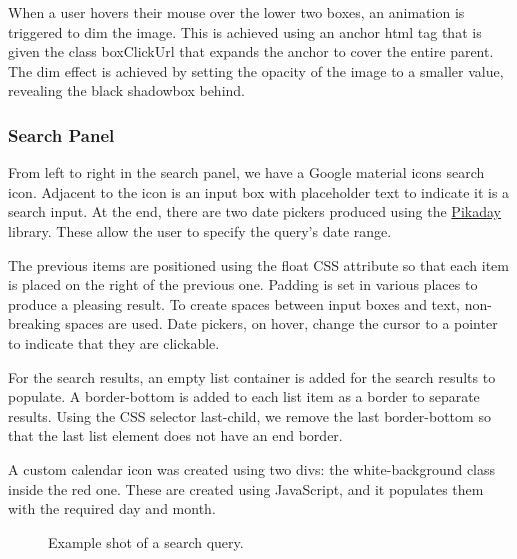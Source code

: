 \documentclass[10pt]{article}
\begin{document}
                When a user hovers their mouse over the lower two boxes, an animation is triggered to dim the image. This is achieved using an anchor html tag that is given the class boxClickUrl that expands the anchor to cover the entire parent. The dim effect is achieved by setting the opacity of the image to a smaller value, revealing the black shadowbox behind.

            \subsubsection{Search Panel}
                From left to right in the search panel, we have a Google material icons search icon. Adjacent to the icon is an input box with placeholder text to indicate it is a search input. At the end, there are two date pickers produced using the \href{https://github.com/dbushell/Pikaday}{Pikaday} library. These allow the user to specify the query's date range.

                The previous items are positioned using the float CSS attribute so that each item is placed on the right of the previous one. Padding is set in various places to produce a pleasing result.  To create spaces between input boxes and text, non-breaking spaces are used. Date pickers, on hover, change the cursor to a pointer to indicate that they are clickable.

                For the search results, an empty list container is added for the search results to populate. A border-bottom is added to each list item as a border to separate results. Using the CSS selector last-child, we remove the last border-bottom so that the last list element does not have an end border.

                A custom calendar icon was created using two divs: the white-background class inside the red one. These are created using JavaScript, and it populates them with the required day and month.

                \begin{figure}[!ht]
                  \centering
                  \caption{Example shot of a search query.}
                \end{figure}
\end{document}
